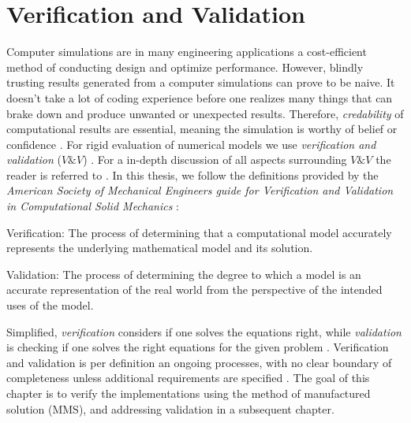 \chapter{Verification and Validation}
 Computer simulations are in many engineering applications a cost-efficient method of conducting design and optimize performance. However, blindly trusting results generated from a computer simulations can prove to be naive. It doesn't take a lot of coding experience before one realizes many things that can brake down and produce unwanted or unexpected results. 
Therefore, \textit{credability} of computational results are essential, meaning the simulation is worthy of belief or confidence \cite{Oberkampf2010}. For rigid evaluation of numerical models we use \textit{verification and validation} ($V\&V$) \cite{Sommerville2006}. For a in-depth discussion of all aspects surrounding $V\&V$ the reader is referred to \cite{Oberkampf2010}. In this thesis, we follow the definitions provided by the \textit{American Society of Mechanical Engineers guide for Verification and Validation in Computational Solid Mechanics}  \cite{Schwer2006}:

\begin{defn}
Verification: The process of determining that a computational model accurately represents
the underlying mathematical model and its solution. 
\end{defn}

\begin{defn}
Validation: The process of determining the degree to which a model is an accurate
representation of the real world from the perspective of the intended uses of the model. 
\label{eq:intcond}
\end{defn}

Simplified, \textit{verification} considers if one solves the equations right, while \textit{validation} is checking if one solves the right equations for the given problem \cite{Roache}. Verification and validation is per definition an ongoing processes, with no clear boundary of completeness unless additional requirements are specified \cite{Roache}. The goal of this chapter is to verify the implementations using the method of manufactured solution (MMS), and addressing validation in a subsequent chapter.

